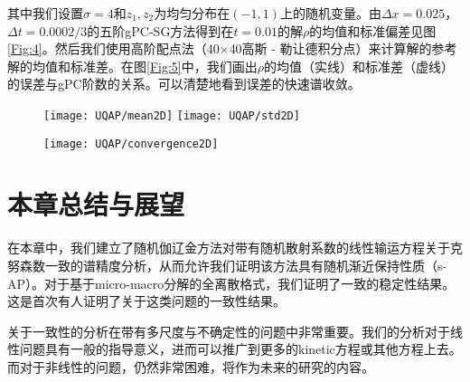 其中我们设置$\sigma = 4$和$z_1,z_2$为均匀分布在$(-1,1)$上的随机变量。由$\Delta x = 0.025$，$\Delta t = 0.0002 / 3$的五阶gPC-SG方法得到在$t = 0.01$的解$\rho$的均值和标准偏差见图\ref{Fig:4}。然后我们使用高阶配点法（40$\times$40高斯 - 勒让德积分点）来计算解的参考解的均值和标准差。在图\ref{Fig:5}中，我们画出$\rho$的均值（实线）和标准差（虚线）的误差与gPC阶数的关系。可以清楚地看到误差的快速谱收敛。
\begin{figure}[H]  
  \texttt{[image: UQAP/mean2D]}
  \texttt{[image: UQAP/std2D]}
\end{figure}
\begin{figure}[H]  
  \centering
  \texttt{[image: UQAP/convergence2D]}
\end{figure}







\section{本章总结与展望} \label{sec:conl}

在本章中，我们建立了随机伽辽金方法对带有随机散射系数的线性输运方程关于克努森数一致的谱精度分析，从而允许我们证明该方法具有随机渐近保持性质（s-AP）。对于基于micro-macro分解的全离散格式，我们证明了一致的稳定性结果。这是首次有人证明了关于这类问题的一致性结果。

关于一致性的分析在带有多尺度与不确定性的问题中非常重要。我们的分析对于线性问题具有一般的指导意义，进而可以推广到更多的kinetic方程或其他方程上去。而对于非线性的问题，仍然非常困难，将作为未来的研究的内容。


